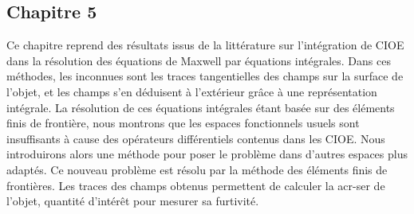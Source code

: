 \subsection*{Chapitre 5}
Ce chapitre reprend des résultats issus de la littérature sur l'intégration de CIOE dans la résolution des équations de Maxwell par équations intégrales.
Dans ces méthodes, les inconnues sont les traces tangentielles des champs sur la surface de l'objet, et les champs s'en déduisent à l'extérieur grâce à une représentation intégrale.
La résolution de ces équations intégrales étant basée sur des éléments finis de frontière, nous montrons que les espaces fonctionnels usuels sont insuffisants à cause des opérateurs différentiels contenus dans les CIOE.
Nous introduirons alors une méthode pour poser le problème dans d'autres espaces plus adaptés. Ce nouveau problème est résolu par la méthode des éléments finis de frontières. Les traces des champs obtenus permettent de calculer la \gls{acr-ser} de l'objet, quantité d'intérêt pour mesurer sa furtivité.
